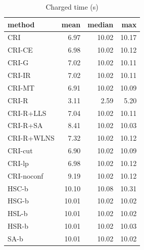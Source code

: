 \begin{table}[htbp]
\centering
\small
\caption{Charged time (s)}
\label{tab:E5_ablation_b10_time}
\begin{tabular}{lrrr}
\toprule
method & mean & median & max \\
\midrule
CRI & 6.97 & 10.02 & 10.17 \\
CRI-CE & 6.98 & 10.02 & 10.12 \\
CRI-G & 7.02 & 10.02 & 10.11 \\
CRI-IR & 7.02 & 10.02 & 10.11 \\
CRI-MT & 6.91 & 10.02 & 10.09 \\
CRI-R & 3.11 & 2.59 & 5.20 \\
CRI-R+LLS & 7.04 & 10.02 & 10.11 \\
CRI-R+SA & 8.41 & 10.02 & 10.03 \\
CRI-R+WLNS & 7.32 & 10.02 & 10.12 \\
CRI-cut & 6.90 & 10.02 & 10.09 \\
CRI-lp & 6.98 & 10.02 & 10.12 \\
CRI-noconf & 9.19 & 10.02 & 10.12 \\
HSC-b & 10.10 & 10.08 & 10.31 \\
HSG-b & 10.01 & 10.02 & 10.02 \\
HSL-b & 10.01 & 10.02 & 10.02 \\
HSR-b & 10.01 & 10.02 & 10.03 \\
SA-b & 10.01 & 10.02 & 10.02 \\
\bottomrule
\end{tabular}
\end{table}

